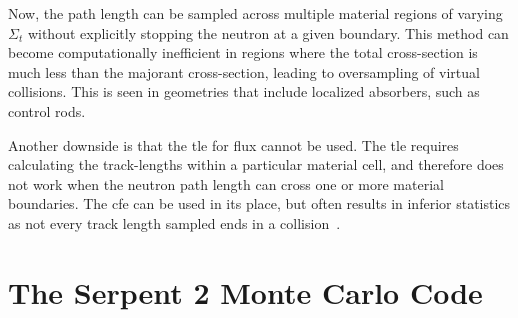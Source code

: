Now, the path length can be sampled across multiple material regions
of varying $\Sigma_t$ without explicitly stopping the neutron at a
given boundary. 
This method can become computationally inefficient in
regions where the total cross-section is much less than the majorant
cross-section, leading to oversampling of virtual collisions. This is
seen in geometries that include localized absorbers, such as control
rods. 

Another downside is that the \gls{tle} for
flux cannot be used. 
The \gls{tle} requires calculating the track-lengths
within a particular material cell, and therefore does not work when
the neutron path length can cross one or more material
boundaries. The \gls{cfe} can be used in its
place, but often results in inferior statistics as not every track
length sampled ends in a collision~\cite{leppanen2013}.

\section{The Serpent 2 Monte Carlo Code}
\label{sec:serpent2}

